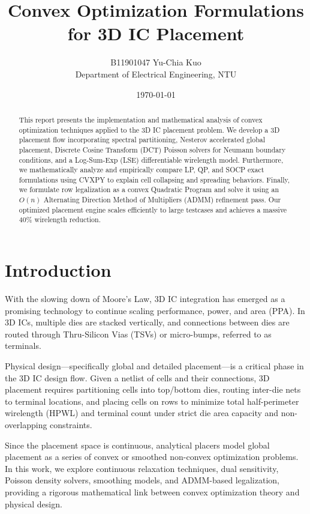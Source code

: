 \documentclass[10pt, twocolumn]{article}
\title{\textbf{Convex Optimization Formulations for 3D IC Placement}}
\author{B11901047 Yu-Chia Kuo \\ Department of Electrical Engineering, NTU}
\date{\today}
\begin{document}
\maketitle

\begin{abstract}
This report presents the implementation and mathematical analysis of convex optimization techniques applied to the 3D IC placement problem. We develop a 3D placement flow incorporating spectral partitioning, Nesterov accelerated global placement, Discrete Cosine Transform (DCT) Poisson solvers for Neumann boundary conditions, and a Log-Sum-Exp (LSE) differentiable wirelength model. Furthermore, we mathematically analyze and empirically compare LP, QP, and SOCP exact formulations using CVXPY to explain cell collapsing and spreading behaviors. Finally, we formulate row legalization as a convex Quadratic Program and solve it using an $O(n)$ Alternating Direction Method of Multipliers (ADMM) refinement pass. Our optimized placement engine scales efficiently to large testcases and achieves a massive 40\% wirelength reduction.
\end{abstract}

\section{Introduction}
With the slowing down of Moore's Law, 3D IC integration has emerged as a promising technology to continue scaling performance, power, and area (PPA). In 3D ICs, multiple dies are stacked vertically, and connections between dies are routed through Thru-Silicon Vias (TSVs) or micro-bumps, referred to as terminals. 

Physical design—specifically global and detailed placement—is a critical phase in the 3D IC design flow. Given a netlist of cells and their connections, 3D placement requires partitioning cells into top/bottom dies, routing inter-die nets to terminal locations, and placing cells on rows to minimize total half-perimeter wirelength (HPWL) and terminal count under strict die area capacity and non-overlapping constraints. 

Since the placement space is continuous, analytical placers model global placement as a series of convex or smoothed non-convex optimization problems. In this work, we explore continuous relaxation techniques, dual sensitivity, Poisson density solvers, smoothing models, and ADMM-based legalization, providing a rigorous mathematical link between convex optimization theory and physical design.
\end{document}
